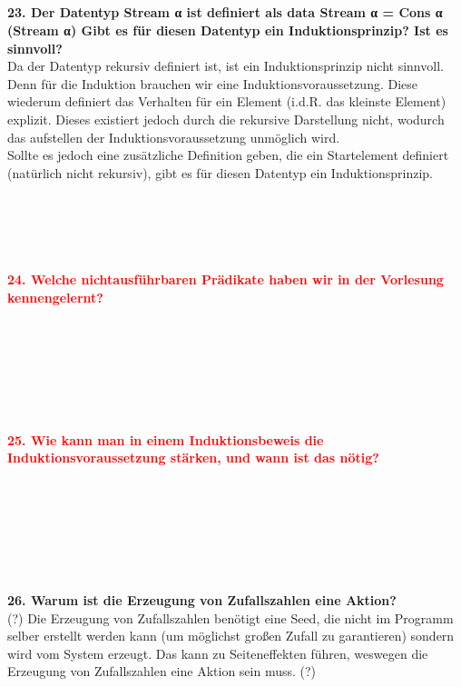 \documentclass{article}
\begin{document}
\\
\\
\\
\\
\textbf{23. Der Datentyp Stream α ist definiert als data Stream α = Cons α (Stream α)
Gibt es für diesen Datentyp ein Induktionsprinzip? Ist es sinnvoll?}
\\
Da der Datentyp rekursiv definiert ist, ist ein Induktionsprinzip nicht sinnvoll. Denn für die Induktion brauchen wir eine Induktionsvoraussetzung. Diese wiederum definiert das Verhalten für ein Element (i.d.R. das kleinste Element) explizit. Dieses existiert jedoch durch die rekursive Darstellung nicht, wodurch das aufstellen der Induktionsvoraussetzung unmöglich wird. \\
Sollte es jedoch eine zusätzliche Definition geben, die ein Startelement definiert (natürlich nicht rekursiv), gibt es für diesen Datentyp ein Induktionsprinzip.
\\
\\
\\
\\
\\
\\
\textcolor{red}{\textbf{24. Welche nichtausführbaren Prädikate haben wir in der Vorlesung kennengelernt?}}
\\
\\
\\
\\
\\
\\
\\
\\
\textcolor{red}{\textbf{25. Wie kann man in einem Induktionsbeweis die Induktionsvoraussetzung stärken, und wann ist das nötig?}}
\\
\\
\\
\\
\\
\\
\\
\\
\textbf{26. Warum ist die Erzeugung von Zufallszahlen eine Aktion?}
\\
(?) Die Erzeugung von Zufallszahlen benötigt eine Seed, die nicht im Programm selber erstellt werden kann (um möglichst großen Zufall zu garantieren) sondern wird vom System erzeugt. Das kann zu Seiteneffekten führen, weswegen die Erzeugung von Zufallszahlen eine Aktion sein muss. (?)\\
\\
\end{document}
